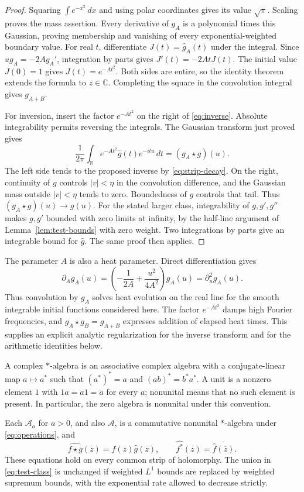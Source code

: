 \documentclass[11pt]{article}
\numberwithin{equation}{section}
\newcommand{\R}{\mathbb R}
\newcommand{\C}{\mathbb C}
\newcommand{\A}{\mathcal A}
\begin{document}
\begin{proof}
Squaring $\int e^{-x^2}\,dx$ and using polar coordinates gives its value
$\sqrt\pi$.  Scaling proves the mass assertion.
Every derivative of $g_A$ is a polynomial times this Gaussian, proving
membership and vanishing of every exponential-weighted boundary value.
For real $t$, differentiate $J(t)=\widehat g_A(t)$ under the integral.
Since $u g_A=-2A g_A'$, integration by parts gives
$J'(t)=-2AtJ(t)$.  The initial value $J(0)=1$ gives $J(t)=e^{-At^2}$.
Both sides are entire, so the identity theorem extends the formula to $z\in\C$.
Completing the square in the convolution integral gives $g_{A+B}$.

For inversion, insert the factor $e^{-At^2}$ on the right of
\eqref{eq:inverse}.  Absolute integrability permits reversing the integrals.
The Gaussian transform just proved gives
\[
 \frac1{2\pi}\int_{\R}e^{-At^2}\widehat g(t)e^{-itu}\,dt
       =(g_A\star g)(u).
\]
The left side tends to the proposed inverse by \eqref{eq:strip-decay}.
On the right, continuity of $g$ controls $|v|<\eta$ in the convolution
difference, and the Gaussian mass outside $|v|<\eta$ tends to zero.
Boundedness of $g$ controls that tail.  Thus $(g_A\star g)(u)\to g(u)$.
For the stated larger class, integrability of $g,g',g''$ makes $g,g'$
bounded with zero limits at infinity, by the half-line argument of
Lemma~\ref{lem:test-bounds} with zero weight.
Two integrations by parts give an integrable bound for $\widehat g$.
The same proof then applies.
\end{proof}

The parameter $A$ is also a heat parameter.  Direct differentiation gives
\[
 \partial_A g_A(u)=\left(-\frac1{2A}+\frac{u^2}{4A^2}\right)g_A(u)
                  =\partial_u^2g_A(u).
\]
Thus convolution by $g_A$ solves heat evolution on the real line for the
smooth integrable initial functions considered here.
The factor $e^{-At^2}$ damps high Fourier frequencies, and
$g_A\star g_B=g_{A+B}$ expresses addition of elapsed heat times.
This supplies an explicit analytic regularization for the inverse transform
and for the arithmetic identities below.

A complex $*$-algebra is an associative complex algebra with a conjugate-linear
map $a\mapsto a^*$ such that $(a^*)^*=a$ and $(ab)^*=b^*a^*$.
A unit is a nonzero element $1$ with $1a=a1=a$ for every $a$;
nonunital means that no such element is present.
In particular, the zero algebra is nonunital under this convention.

\begin{proposition}
\label{prop:algebra}
Each $\A_a$ for $a>0$, and also $\A$, is a commutative nonunital
$*$-algebra under \eqref{eq:operations}, and
\begin{equation}
 \widehat{f\star g}(z)=\widehat f(z)\widehat g(z),\qquad
 \widehat{f^*}(z)=\overline{\widehat f(\bar z)}.
 \label{eq:star-transform}
\end{equation}
These equations hold on every common strip of holomorphy.
The union in \eqref{eq:test-class} is unchanged if weighted $L^1$ bounds
are replaced by weighted supremum bounds, with the exponential rate allowed
to decrease strictly.
\end{proposition}
\end{document}
